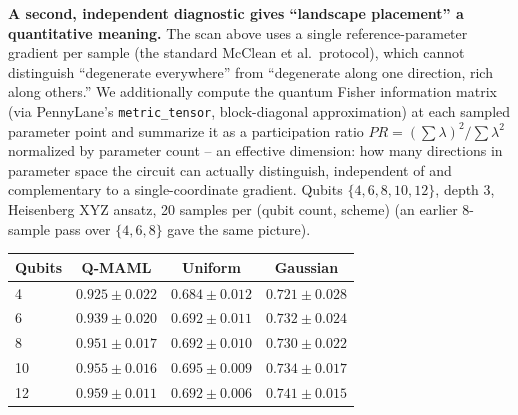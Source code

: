\documentclass[11pt]{article}
\begin{document}
\begin{keyresult}
\textbf{A second, independent diagnostic gives ``landscape placement'' a quantitative meaning.} The scan
above uses a single reference-parameter gradient per sample (the standard McClean et al.\ protocol),
which cannot distinguish ``degenerate everywhere'' from ``degenerate along one direction, rich along
others.'' We additionally compute the quantum Fisher information matrix (via PennyLane's
\texttt{metric\_tensor}, block-diagonal approximation) at each sampled parameter point and summarize it as
a participation ratio $PR=(\sum\lambda)^2/\sum\lambda^2$ normalized by parameter count -- an effective
dimension: how many directions in parameter space the circuit can actually distinguish, independent of and
complementary to a single-coordinate gradient. Qubits $\{4,6,8,10,12\}$, depth 3, Heisenberg XYZ ansatz, 20
samples per (qubit count, scheme) (an earlier 8-sample pass over $\{4,6,8\}$ gave the same picture).

\begin{center}
\label{tab:fisher-effdim}
\begin{tabular}{lccc}
\toprule
Qubits & Q-MAML & Uniform & Gaussian \\
\midrule
4 & $\mathbf{0.925}\pm0.022$ & $0.684\pm0.012$ & $0.721\pm0.028$ \\
6 & $\mathbf{0.939}\pm0.020$ & $0.692\pm0.011$ & $0.732\pm0.024$ \\
8 & $\mathbf{0.951}\pm0.017$ & $0.692\pm0.010$ & $0.730\pm0.022$ \\
10 & $\mathbf{0.955}\pm0.016$ & $0.695\pm0.009$ & $0.734\pm0.017$ \\
12 & $\mathbf{0.959}\pm0.011$ & $0.692\pm0.006$ & $0.741\pm0.015$ \\
\bottomrule
\end{tabular}
\end{center}


\end{keyresult}
\end{document}
